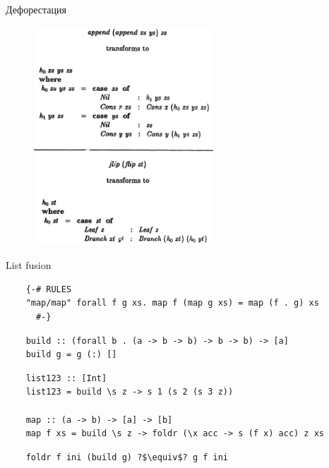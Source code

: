     \begin{frame}[fragile]{Дефорестация}
        \begin{figure}
            \centering
            \includegraphics[width=0.6\textwidth]{figs/deforestation-examples}
        \end{figure}
    \end{frame}

    \begin{frame}[fragile]{List fusion}
        \pause
        \begin{verbatim}
    {-# RULES
    "map/map" forall f g xs. map f (map g xs) = map (f . g) xs
      #-}
        \end{verbatim}
        \pause\vspace{1em}
        \begin{verbatim}
    build :: (forall b . (a -> b -> b) -> b -> b) -> [a]
    build g = g (:) []
        \end{verbatim}
        \pause\vspace{1em}
        \begin{verbatim}
    list123 :: [Int]
    list123 = build \s z -> s 1 (s 2 (s 3 z))

    map :: (a -> b) -> [a] -> [b]
    map f xs = build \s z -> foldr (\x acc -> s (f x) acc) z xs
        \end{verbatim}
        \pause\vspace{1em}
        \begin{verbatim}
    foldr f ini (build g) ?$\equiv$? g f ini
        \end{verbatim}
    \end{frame}

